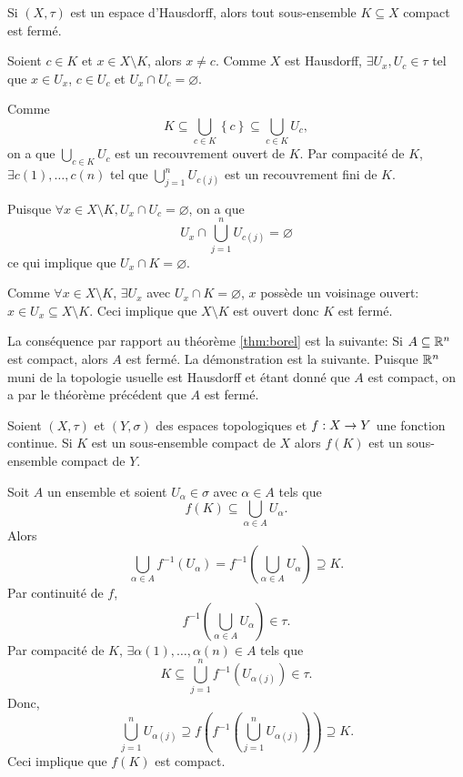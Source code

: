 \documentclass[french]{article}
\begin{document}
\begin{theoreme}
  Si $(X, \tau)$ est un espace d'Hausdorff, alors tout sous-ensemble $K \subseteq X$ compact est fermé.

  \tcblower
  \begin{preuve}
    Soient $c \in K$ et $x \in X\setminus K$, alors $x \not = c$. Comme  $X$ est Hausdorff, $\exists U_x, U_c \in \tau$ tel que $x \in U_x$, $c \in U_c$ et $U_x \cap U_c = \varnothing$.
    \par Comme
    $$K \subseteq \bigcup_{c \in K} \left\{ c \right\} \subseteq \bigcup_{c \in K} U_c, $$
    on a que $\bigcup\limits_{c \in K} U_c$ est un recouvrement ouvert de $K$. Par compacité de $K$,  $\exists c(1), \dots, c(n)$ tel que $\bigcup\limits_{j=1}^n U_{c(j)}$ est un recouvrement fini de  $K$.
    \par Puisque  $\forall x \in X \setminus K, U_x \cap U_c = \varnothing$, on a que
    $$U_x \cap \bigcup_{j=1}^n U_{c(j)} = \varnothing$$
    ce qui implique que $U_x \cap K = \varnothing$.
    \par Comme $\forall x \in X \setminus K$, $\exists U_x$ avec $U_x \cap K = \varnothing$, $x$ possède un voisinage ouvert: $x \in U_x \subseteq X \setminus K$. Ceci implique que $X \setminus K$ est ouvert donc $K$ est fermé.
  \end{preuve}
\end{theoreme}

La conséquence par rapport au théorème \ref{thm:borel} est la suivante: Si $A \subseteq \mathbb{R}^n$ est compact, alors $A$ est fermé. La démonstration est la suivante. Puisque $\mathbb{R}^n$ muni de la topologie usuelle est Hausdorff et étant donné que $A$ est compact, on a par le théorème précédent que $A$ est fermé.

\begin{theoreme}\label{thm:comp}
  Soient $(X, \tau)$ et $(Y, \sigma)$ des espaces topologiques et $f: X \rightarrow Y$ une fonction continue. Si $K$ est un sous-ensemble compact de $X$ alors $f(K)$ est un sous-ensemble compact de $Y$.

  \tcblower
  \begin{preuve}
    Soit $A$ un ensemble et soient $U_\alpha \in \sigma$ avec $\alpha \in A$ tels que $$f(K) \subseteq \bigcup\limits_{\alpha \in A} U_\alpha.$$
    Alors
    $$\bigcup_{\alpha \in A} f^{-1}(U_\alpha) = f^{-1}\left( \bigcup_{\alpha \in  A} U_\alpha \right) \supseteq K.$$ 
    Par continuité de $f$,
     $$f^{-1}\left( \bigcup_{\alpha \in  A} U_\alpha \right) \in \tau.$$
     Par compacité de $K$,  $\exists \alpha(1), \dots, \alpha(n) \in A$ tels que
     $$K \subseteq \bigcup_{j=1}^n f^{-1}(U_{\alpha(j)}) \in \tau.$$
     Donc,
     $$\bigcup_{j=1}^n U_{\alpha(j)} \supseteq f\left( f^{-1}\left( \bigcup_{j=1}^n U_{\alpha(j)} \right) \right) \supseteq K.$$
     Ceci implique que $f(K)$ est compact.
  \end{preuve}
\end{theoreme}
\end{document}
